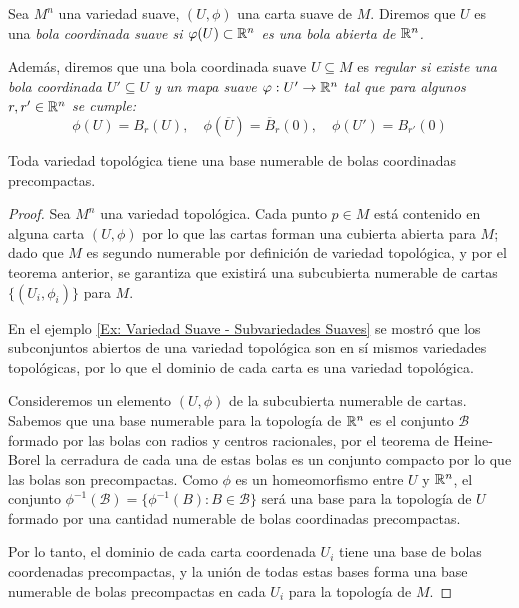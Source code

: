 \begin{definition}\label{Definición: Bolas Coordinadas Suaves}
  Sea $M^n$ una variedad suave, $(U,\phi)$ una carta suave de $M$. Diremos que $U$ es una \it{bola coordinada suave} si $\varphi(U) \subset \mathbb{R}^n$ es una bola abierta de $\mathbb{R}^n$.
  
  Además, diremos que una bola coordinada suave $U \subseteq M$ es \it{regular} si existe una bola coordinada $U' \subseteq U$ y un mapa suave $\varphi: U' \to \mathbb{R}^n$ tal que para algunos $r, r' \in \mathbb{R}^n$ se cumple:
  \[
    \phi(U) = B_r(U), \quad \phi(\overline{U}) = \overline{B}_r(0), \quad \phi(U') = B_{r'}(0)
  \] 
\end{definition}

\begin{lemma}\label{Lemma: Bolas Precompactas}
  Toda variedad topológica tiene una base numerable de bolas coordinadas precompactas.
\end{lemma}

\begin{proof}
  Sea $M^n$ una variedad topológica. Cada punto $p \in M$ está contenido en alguna carta $(U,\phi)$ por lo que las cartas forman una cubierta abierta para $M$; dado que $M$ es segundo numerable por definición de variedad topológica, y por el teorema anterior, se garantiza que existirá una subcubierta numerable de cartas $\{(U_i,\phi_i)\}$ para $M$.

  En el ejemplo \ref{Ex: Variedad Suave - Subvariedades Suaves} se mostró que los subconjuntos abiertos de una variedad topológica son en sí mismos variedades topológicas, por lo que el dominio de cada carta es una variedad topológica.

  Consideremos un elemento $(U,\phi)$ de la subcubierta numerable de cartas. Sabemos que una base numerable para la topología de $\mathbb{R}^n$ es el conjunto $\mathcal{B}$ formado por las bolas con radios y centros racionales, por el teorema de Heine-Borel la cerradura de cada una de estas bolas es un conjunto compacto por lo que las bolas son precompactas. Como $\phi$ es un homeomorfismo entre $U$ y $\mathbb{R}^n$, el conjunto $\phi^{-1} (\mathcal{B})= \{\phi^{-1}(B): B \in \mathcal{B}\}$ será una base para la topología de $U$ formado por una cantidad numerable de bolas coordinadas precompactas.

  Por lo tanto, el dominio de cada carta coordenada $U_i$ tiene una base de bolas coordenadas precompactas, y la unión de todas estas bases forma una base numerable de bolas precompactas en cada $U_i$ para la topología de $M$.
\end{proof}


